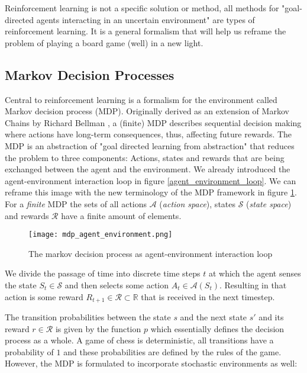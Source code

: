 Reinforcement learning is not a specific solution or method, all methods for "goal-directed agents interacting in an uncertain environment" \cite[p. 3]{sutton_reinforcement_2018} are types of reinforcement learning. It is a general formalism that will help us reframe the problem of playing a board game (well) in a new light.

\subsection{Markov Decision Processes}
Central to reinforcement learning is a formalism for the environment called Markov decision process (MDP). Originally derived as an extension of Markov Chains by Richard Bellman \cite{yang_markov_2019, bellman_markovian_1957}, a (finite) MDP describes sequential decision making where actions have long-term consequences, thus, affecting future rewards. The MDP is an abstraction of "goal directed learning from abstraction" that reduces the problem to three components: Actions, states and rewards that are being exchanged between the agent and the environment. We already introduced the agent-environment interaction loop in figure \ref{agent_environment_loop}. We can reframe this image with the new terminology of the MDP framework in figure \ref{mdp_agent_environment}. For a \textit{finite} MDP the sets of all actions $ \mathcal{A}$ (\textit{action space}), states $\mathcal{S}$ (\textit{state space}) and rewards $ \mathcal{R} $ have a finite amount of elements.

\begin{figure}
    \centering
    \texttt{[image: mdp\_agent\_environment.png]}
    \caption{The markov decision process as agent-environment interaction loop}
    \label{mdp_agent_environment}
\end{figure}

We divide the passage of time into discrete time steps $ t $ at which the agent senses the state $ S_t \in \mathcal{S} $ and then selects some action $ A_t \in \mathcal{A}(S_t) $. Resulting in that action is some reward $ R_{t+1} \in \mathcal{R} \subset \mathbb{R} $ that is received in the next timestep.

The transition probabilities between the state $ s $ and the next state $ s' $ and its reward $r \in \mathcal{R}$ is given by the function $ p $ which essentially defines the decision process as a whole. A game of chess is deterministic, all transitions have a probability of $1$ and these probabilities are defined by the rules of the game. However, the MDP is formulated to incorporate stochastic environments as well:

